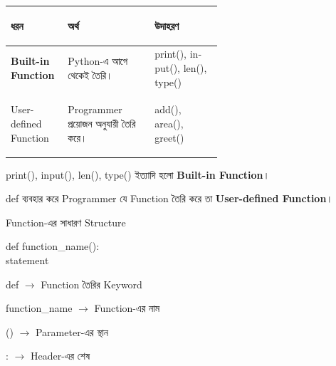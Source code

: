 \begin{tabularx}
{\linewidth}
{
|>{\bfseries\RaggedRight\arraybackslash}p{0.27\linewidth}
|Y
|>{\RaggedRight\arraybackslash}p{0.32\linewidth}|
}

\hline
{}

\textbf{ধরন}
&
\textbf{অর্থ}
&
\textbf{উদাহরণ}
\\
\hline

Built-in Function
&
Python-এ আগে থেকেই তৈরি।
&
\textenglish{\ttfamily print(), input(), len(), type()}
\\
\hline

User-defined Function
&
Programmer প্রয়োজন অনুযায়ী তৈরি করে।
&
\textenglish{\ttfamily add(), area(), greet()}
\\
\hline

\end{tabularx}

\begin{rememberbox}

\textenglish{\ttfamily print()},
\textenglish{\ttfamily input()},
\textenglish{\ttfamily len()},
\textenglish{\ttfamily type()}
ইত্যাদি হলো \textbf{Built-in Function}।

\textenglish{\ttfamily def}
ব্যবহার করে Programmer যে Function তৈরি করে তা
\textbf{User-defined Function}।

\end{rememberbox}



\begin{codeoutputbox}{Function-এর সাধারণ Structure}

\noindent
\begin{minipage}[t]{0.52\linewidth}
\codeheading

\begin{english}
\ttfamily
def function\_name():\\
\hspace*{4mm}statement
\end{english}

\end{minipage}
\hfill
\begin{minipage}[t]{0.44\linewidth}
\outputheading

\textenglish{\ttfamily def}
\(\longrightarrow\)
Function তৈরির Keyword

\medskip

\textenglish{\ttfamily function\_name}
\(\longrightarrow\)
Function-এর নাম

\medskip

\textenglish{\ttfamily ()}
\(\longrightarrow\)
Parameter-এর স্থান

\medskip

\textenglish{\ttfamily :}
\(\longrightarrow\)
Header-এর শেষ

\end{minipage}

\end{codeoutputbox}

